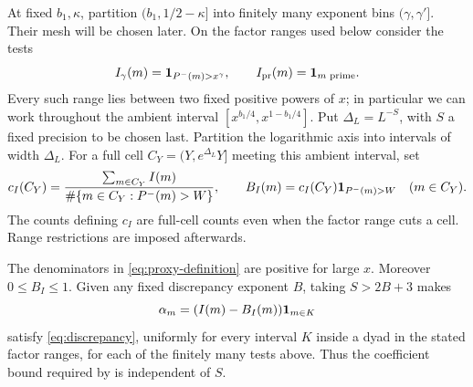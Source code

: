 At fixed $b_1,\kappa$, partition $(b_1,1/2-\kappa]$ into finitely
many exponent bins $(\gamma,\gamma']$. Their mesh will be chosen
later. On the factor ranges used below consider the tests
\[
 I_\gamma(m)=\mathbf 1_{P^{-}(m)>x^\gamma},\qquad
 I_{\mathrm{pr}}(m)=\mathbf 1_{m\text{ prime}}.
\]
Every such range lies between two fixed positive powers of $x$;
in particular we can work throughout the ambient interval
$[x^{b_1/4},x^{1-b_1/4}]$. Put $\Delta_L=L^{-S}$, with $S$ a
fixed precision to be chosen last. Partition the logarithmic axis
into intervals of width $\Delta_L$. For a full cell
$C_Y=(Y,e^{\Delta_L}Y]$ meeting this ambient interval, set
\begin{equation}\label{eq:proxy-definition}
 c_I(C_Y)=\frac{\sum_{m\in C_Y}I(m)}
                   {\#\{m\in C_Y:P^{-}(m)>W\}},\qquad
 B_I(m)=c_I(C_Y)\mathbf 1_{P^{-}(m)>W}\quad(m\in C_Y).
\end{equation}
The counts defining $c_I$ are full-cell counts even when the factor
range cuts a cell. Range restrictions are imposed afterwards.

\begin{lemma}\label{lem:proxy-discrepancy}
The denominators in \eqref{eq:proxy-definition} are positive for
large $x$. Moreover $0\le B_I\le1$. Given any fixed discrepancy
exponent $B$, taking $S>2B+3$ makes
\[
 \alpha_m=(I(m)-B_I(m))\mathbf 1_{m\in K}
\]
satisfy \eqref{eq:discrepancy}, uniformly for every interval $K$
inside a dyad in the stated factor ranges, for each of the finitely
many tests above. Thus the coefficient bound required by
 is independent of $S$.
\end{lemma}


